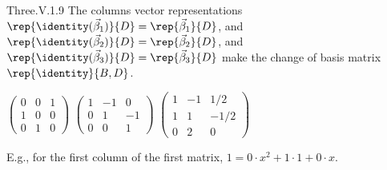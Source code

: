 \begin{ans}{Three.V.1.9}
      The columns vector representations
      $\rep{\identity(\vec{\beta}_1)}{D}=\rep{\vec{\beta}_1}{D}$,
      and $\rep{\identity(\vec{\beta}_2)}{D}=\rep{\vec{\beta}_2}{D}$,
      and $\rep{\identity(\vec{\beta}_3)}{D}=\rep{\vec{\beta}_3}{D}$
      make the change of basis matrix
      $\rep{\identity}{B,D}$.
      \begin{exparts*}
        \partsitem \( \begin{pmatrix}
                   0  &0  &1  \\
                   1  &0  &0  \\
                   0  &1  &0
                 \end{pmatrix} \)
        \partsitem \( \begin{pmatrix}
                   1  &-1 &0  \\
                   0  &1  &-1 \\
                   0  &0  &1
                 \end{pmatrix} \)
        \partsitem \( \begin{pmatrix}
                   1  &-1 &1/2  \\
                   1  &1  &-1/2 \\
                   0  &2  &0
                 \end{pmatrix} \)
      \end{exparts*}
      E.g., for the first column of the first matrix,
      $1=0\cdot x^2+1\cdot 1+0\cdot x$.
     
\end{ans}
